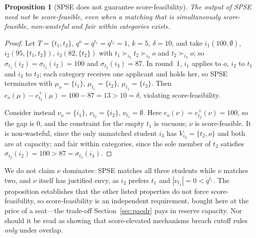 \documentclass[a4paper,twoside]{article}
\newtheorem{proposition}{Proposition}
\theoremstyle{definition}
\begin{document}
\begin{proposition}[SPSE does not guarantee score-feasibility]
\label{prop:spse-not-sf}
The output of SPSE need not be score-feasible, even when a matching that is simultaneously score-feasible, non-wasteful and fair within categories exists.
\end{proposition}

\begin{proof}
Let $T=\{t_1,t_2\}$, $q^o=q^{t_1}=q^{t_2}=1$, $k=5$, $\delta=10$, and take $i_1(100,\emptyset)$, $i_2(95,\{t_1,t_2\})$, $i_3(82,\{t_2\})$ with $t_1\succ_{i_2}t_2\succ_{i_2}o$ and $t_2\succ_{i_3}o$; so $\sigma_{t_1}(i_2)=\sigma_{t_2}(i_2)=100$ and $\sigma_{t_2}(i_3)=87$. In round~1, $i_1$ applies to $o$, $i_2$ to $t_1$ and $i_3$ to $t_2$; each category receives one applicant and holds her, so SPSE terminates with $\mu_o=\{i_1\}$, $\mu_{t_1}=\{i_2\}$, $\mu_{t_2}=\{i_3\}$. Then $e_o(\mu)-e_{t_2}^+(\mu)=100-87=13>10=\delta$, violating score-feasibility.

Consider instead $\nu_o=\{i_1\}$, $\nu_{t_2}=\{i_2\}$, $\nu_{t_1}=\emptyset$. Here $e_o(\nu)=e_{t_2}^+(\nu)=100$, so the gap is $0$, and the constraint for the empty $t_1$ is vacuous; $\nu$ is score-feasible. It is non-wasteful, since the only unmatched student $i_3$ has $V_{i_3}=\{t_2,o\}$ and both are at capacity; and fair within categories, since the sole member of $t_2$ satisfies $\sigma_{t_2}(i_2)=100>87=\sigma_{t_2}(i_3)$.
\end{proof}

We do not claim $\nu$ dominates: SPSE matches all three students while $\nu$ matches two, and $\nu$ itself has justified envy, as $i_2$ prefers $t_1$ and $|\nu_{t_1}|=0<q^{t_1}$. The proposition establishes that the other listed properties do not force score-feasibility, so score-feasibility is an independent requirement, bought here at the price of a seat---the trade-off Section~\ref{sec:paodr} pays in reserve capacity. Nor should it be read as showing that score-elevated mechanisms breach cutoff rules \emph{only} under overlap.
\end{document}
